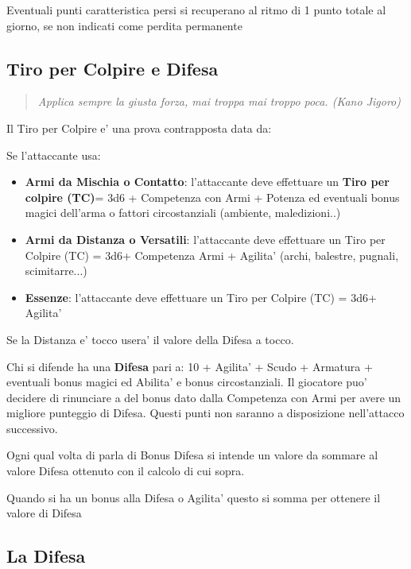 \documentclass[a4paper,11pt,twoside,openany]{book}
\begin{document}
	Eventuali punti caratteristica persi si recuperano al ritmo di 1 punto totale al giorno, se non indicati come perdita permanente
	\pagebreak
	
	\subsection{Tiro per Colpire e Difesa}
	
	\label{tiro-per-colpire}
	\begin{quote}\textit{Applica sempre la giusta forza, mai troppa mai troppo poca. (Kano Jigoro)
	}\end{quote}
	
	Il Tiro per Colpire e' una prova contrapposta data da:
	
	Se l'attaccante usa:
	
	\begin{itemize}
		\item \textbf{Armi da Mischia o Contatto}: l'attaccante deve effettuare un \textbf{Tiro per colpire (TC)}= 3d6 + Competenza con Armi + Potenza ed eventuali bonus magici dell'arma o fattori circostanziali (ambiente, maledizioni..)
		\item
		\textbf{Armi da Distanza o Versatili}: l'attaccante deve effettuare un Tiro per Colpire (TC) = 3d6+ Competenza Armi + Agilita' (archi, balestre, pugnali, scimitarre...)
		\item	\textbf{Essenze}: l'attaccante deve effettuare un Tiro per Colpire (TC) = 3d6+ Agilita' 
	\end{itemize}
	
	Se la Distanza e' tocco usera' il valore della Difesa a tocco.
	
	Chi si difende ha una \textbf{Difesa} pari a: 10 + Agilita' + Scudo + Armatura + eventuali bonus magici ed Abilita' e bonus circostanziali. 
	Il giocatore puo' decidere di rinunciare a del bonus dato dalla Competenza con Armi per avere un migliore punteggio di Difesa. Questi punti non saranno a disposizione nell'attacco successivo.
	
	Ogni qual volta di parla di Bonus Difesa si intende un valore da sommare al valore Difesa ottenuto con il calcolo di cui sopra.
	
	Quando si ha un bonus alla Difesa o Agilita' questo si somma per ottenere il valore di Difesa
	
	\subsection{La Difesa}
	
\end{document}
